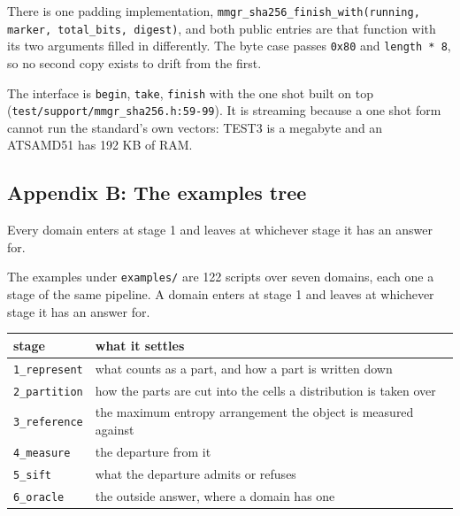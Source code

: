 There is one padding implementation, \texttt{mmgr\_\allowbreak{}sha256\_\allowbreak{}finish\_\allowbreak{}with(running, marker, total\_\allowbreak{}bits, digest)}, and both public entries are that function with its two arguments filled in differently. The byte case passes \texttt{0x80} and \texttt{length * 8}, so no second copy exists to drift from the first.

The interface is \texttt{begin}, \texttt{take}, \texttt{finish} with the one shot built on top (\texttt{test/\allowbreak{}support/\allowbreak{}mmgr\_\allowbreak{}sha256.\allowbreak{}h:59-\allowbreak{}99}). It is streaming because a one shot form cannot run the standard's own vectors: TEST3 is a megabyte and an ATSAMD51 has 192 KB of RAM.

\subsection{Appendix B: The examples tree}

Every domain enters at stage 1 and leaves at whichever stage it has an answer for.

The examples under \texttt{examples/\allowbreak{}} are 122 scripts over seven domains, each one a
stage of the same pipeline. A domain enters at stage 1 and leaves at whichever stage it has an
answer for.

\begin{center}
\begin{tabular}{@{}>{\raggedright\arraybackslash}p{}>{\raggedright\arraybackslash}p{}@{}}
\toprule
stage & what it settles \\
\midrule
\texttt{1\_represent} & what counts as a part, and how a part is written down \\
\texttt{2\_partition}  & how the parts are cut into the cells a distribution is taken over \\
\texttt{3\_reference}  & the maximum entropy arrangement the object is measured against \\
\texttt{4\_measure}    & the departure from it \\
\texttt{5\_sift}       & what the departure admits or refuses \\
\texttt{6\_oracle}     & the outside answer, where a domain has one \\
\bottomrule
\end{tabular}
\end{center}

